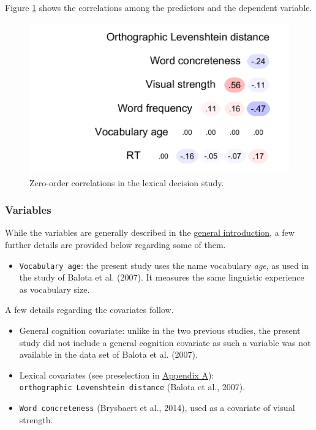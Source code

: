 \documentclass[
  12pt,
  man,floatsintext]{apa7}
\providecommand{\tightlist}{%
  \setlength{\itemsep}{0pt}\setlength{\parskip}{0pt}}
\begin{document}
Figure \ref{fig:lexicaldecision-correlations} shows the correlations among the predictors and the dependent variable.

\begin{figure}

{\centering \includegraphics[width=0.52\linewidth]{thesis-core_files/figure-latex/lexicaldecision-correlations-1} 

}

\caption{Zero-order correlations in the lexical decision study.}\label{fig:lexicaldecision-correlations}
\end{figure}

\hypertarget{variables-2}{%
\subsubsection{Variables}\label{variables-2}}

While the variables are generally described in the \protect\hyperlink{present-studies}{\underline{general introduction}}, a few further details are provided below regarding some of them.

\begin{itemize}
\tightlist
\item
  \texttt{Vocabulary\ age}: the present study uses the name vocabulary \emph{age}, as used in the study of Balota et al. (2007). It measures the same linguistic experience as vocabulary size.
\end{itemize}

A few details regarding the covariates follow.

\begin{itemize}
\item
  General cognition covariate: unlike in the two previous studies, the present study did not include a general cognition covariate as such a variable was not available in the data set of Balota et al. (2007).
\item
  Lexical covariates (see preselection in \protect\hyperlink{appendix-A-lexical-covariates}{\underline{Appendix A}}): \texttt{orthographic\ Levenshtein\ distance} (Balota et al., 2007).
\item
  \texttt{Word\ concreteness} (Brysbaert et al., 2014), used as a covariate of visual strength.
\end{itemize}
\end{document}
